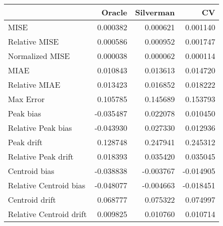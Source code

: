 \begin{tabular}{lrrr}
  \hline
 & Oracle & Silverman & CV \\ 
  \hline
MISE & 0.000382 & 0.000621 & 0.001140 \\ 
  Relative MISE & 0.000586 & 0.000952 & 0.001747 \\ 
  Normalized MISE & 0.000038 & 0.000062 & 0.000114 \\ 
  MIAE & 0.010843 & 0.013613 & 0.014720 \\ 
  Relative MIAE & 0.013423 & 0.016852 & 0.018222 \\ 
  Max Error & 0.105785 & 0.145689 & 0.153793 \\ 
  Peak bias & -0.035487 & 0.022078 & 0.010450 \\ 
  Relative Peak bias & -0.043930 & 0.027330 & 0.012936 \\ 
  Peak drift & 0.128748 & 0.247941 & 0.245312 \\ 
  Relative Peak drift & 0.018393 & 0.035420 & 0.035045 \\ 
  Centroid bias & -0.038838 & -0.003767 & -0.014905 \\ 
  Relative Centroid bias & -0.048077 & -0.004663 & -0.018451 \\ 
  Centroid drift & 0.068777 & 0.075322 & 0.074997 \\ 
  Relative Centroid drift & 0.009825 & 0.010760 & 0.010714 \\ 
   \hline
\end{tabular}
